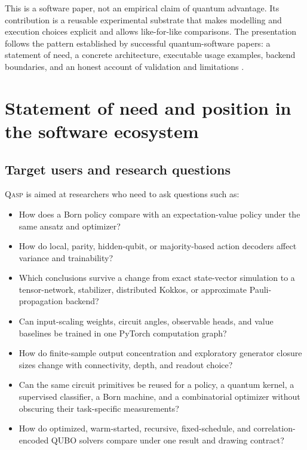\documentclass[10pt]{article}
\newcommand{\qasp}{\textsc{Qasp}}
\begin{document}
This is a software paper, not an empirical claim of quantum advantage.  Its contribution is a reusable experimental substrate that makes modelling and execution choices explicit and allows like-for-like comparisons.  The presentation follows the pattern established by successful quantum-software papers: a statement of need, a concrete architecture, executable usage examples, backend boundaries, and an honest account of validation and limitations \cite{steiger2018projectq,larose2022mitiq,zhang2023tensorcircuit}.

\section{Statement of need and position in the software ecosystem}
\label{sec:need}

\subsection{Target users and research questions}

\qasp{} is aimed at researchers who need to ask questions such as:

\begin{itemize}
  \item How does a Born policy compare with an expectation-value policy under the same ansatz and optimizer?
  \item How do local, parity, hidden-qubit, or majority-based action decoders affect variance and trainability?
  \item Which conclusions survive a change from exact state-vector simulation to a tensor-network, stabilizer, distributed Kokkos, or approximate Pauli-propagation backend?
  \item Can input-scaling weights, circuit angles, observable heads, and value baselines be trained in one PyTorch computation graph?
  \item How do finite-sample output concentration and exploratory generator
        closure sizes change with connectivity, depth, and readout choice?
  \item Can the same circuit primitives be reused for a policy, a quantum
        kernel, a supervised classifier, a Born machine, and a combinatorial
        optimizer without obscuring their task-specific measurements?
  \item How do optimized, warm-started, recursive, fixed-schedule, and
        correlation-encoded QUBO solvers compare under one result and drawing
        contract?
\end{itemize}
\end{document}
